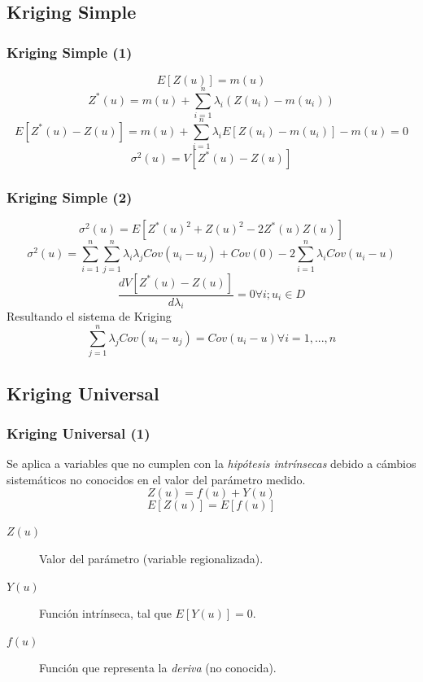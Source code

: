 \documentclass{beamer}
\begin{document}
\subsection{Kriging Simple}
\begin{frame}
\frametitle{Kriging Simple (1)}
\begin{equation}
E[Z(u)] = m(u)
\end{equation}
\begin{equation}
Z^*(u) = m(u) + \sum_{i=1}^n \lambda_i (Z(u_i) - m(u_i))
\end{equation}
\begin{equation}
E[Z^*(u)-Z(u)]=m(u)+\sum_{i=1}^n\lambda_i E[Z(u_i)-m(u_i)] - m(u) = 0
\end{equation}
\begin{equation}
\sigma^2(u) = V[Z^*(u)-Z(u)]
\end{equation}
\end{frame}

\begin{frame}
\frametitle{Kriging Simple (2)}
\begin{equation}
\sigma^2(u) = E[Z^*(u)^2 + Z(u)^2 - 2 Z^*(u) Z(u)]
\end{equation}
\begin{equation}
\sigma^2(u) = \sum_{i=1}^n \sum_{j=1}^n \lambda_i \lambda_j Cov(u_i - u_j) + Cov(0) - 2 \sum_{i=1}^n \lambda_i Cov(u_i - u)
\end{equation}
\begin{equation}
\frac{dV[Z^*(u)-Z(u)]}{d\lambda_i} = 0 \forall i; u_i \in D
\end{equation}
Resultando el sistema de Kriging
\begin{equation}
\sum_{j=1}^n \lambda_j Cov(u_i - u_j) = Cov(u_i - u)  \forall i = 1,...,n
\end{equation}
\end{frame}


\subsection{Kriging Universal}
\begin{frame}
\frametitle{Kriging Universal (1)}
Se aplica a variables que no cumplen con la \emph{hipótesis intrínsecas} debido a cámbios sistemáticos no conocidos en el valor del parámetro medido.
\begin{equation}
\label{eq:VariableAleatoriaRegionalizadaConDeriva}
Z(u) = f(u) + Y(u)
\end{equation}
\begin{equation}
E[Z(u)] = E[f(u)]
\end{equation}
\begin{description}
\item[$Z(u)$] Valor del parámetro (variable regionalizada).
\item[$Y(u)$] Función intrínseca, tal que $E[Y(u)] = 0$.
\item[$f(u)$] Función que representa la \emph{deriva} (no conocida).
\end{description}
\end{frame}
\end{document}
